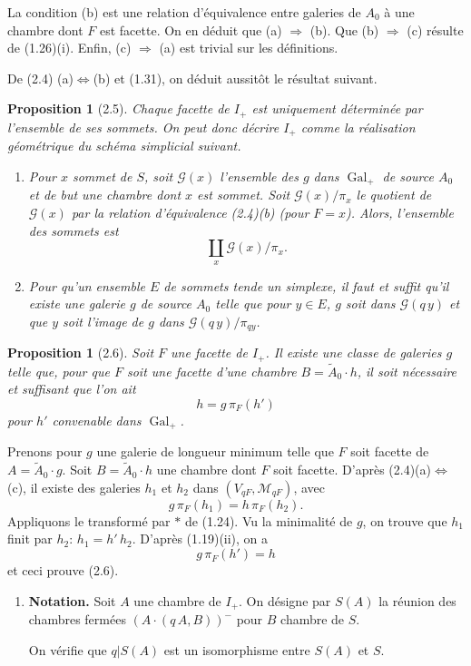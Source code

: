 \documentclass[12pt]{article}
\newtheorem{proposition}[theoreme]{Proposition}
\theoremstyle{remark}
\DeclareMathOperator{\Gal}{Gal}
\begin{document}
La condition (b) est une relation d'équivalence entre galeries de $A_0$ à une chambre dont $F$ est facette. On en déduit que (a) $\Rightarrow$ (b). Que (b) $\Rightarrow$ (c) résulte de (1.26)(i). Enfin, (c) $\Rightarrow$ (a) est trivial sur les définitions.

De (2.4) (a)$\Leftrightarrow$(b) et (1.31), on déduit aussitôt le résultat suivant.

\begin{proposition}[2.5]
Chaque facette de $I_+$ est uniquement déterminée par l'ensemble de ses sommets. On peut donc décrire $I_+$ comme la réalisation géométrique du schéma simplicial suivant.
\begin{enumerate}
\item[a)] Pour $x$ sommet de $S$, soit $\mathscr{G}(x)$ l'ensemble des $g$ dans $\Gal_+$ de source $A_0$ et de but une chambre dont $x$ est sommet. Soit $\mathscr{G}(x)/\pi_x$ le quotient de $\mathscr{G}(x)$ par la relation d'équivalence (2.4)(b) (pour $F = x$). Alors, l'ensemble des sommets est
\[\coprod_x \mathscr{G}(x)/\pi_x.\]
\item[b)] Pour qu'un ensemble $E$ de sommets \emph{tende} un simplexe, il faut et suffit qu'il existe une galerie $g$ de source $A_0$ telle que pour $y \in E$, $g$ soit dans $\mathscr{G}(q \, y)$ et que $y$ soit l'image de $g$ dans $\mathscr{G}(q \, y)/\pi_{q y}$.
\end{enumerate}
\end{proposition}

\begin{proposition}[2.6]
Soit $F$ une facette de $I_+$. Il existe une classe de galeries $g$ telle que, pour que $F$ soit une facette d'une chambre $B = \tilde{A}_0 \cdot h$, il soit nécessaire et suffisant que l'on ait
\[h = g \, \pi_F(h')\]
pour $h'$ convenable dans $\Gal_+$.
\end{proposition}

Prenons pour $g$ une galerie de longueur minimum telle que $F$ soit facette de $A = \tilde{A}_0 \cdot g$. Soit $B = \tilde{A}_0 \cdot h$ une chambre dont $F$ soit facette. D'après (2.4)(a)$\Leftrightarrow$(c), il existe des galeries $h_1$ et $h_2$ dans $(V_{qF}, \mathcal{M}_{qF})$, avec
\[g \, \pi_F(h_1) = h \, \pi_F(h_2).\]
Appliquons le transformé par $*$ de (1.24). Vu la minimalité de $g$, on trouve que $h_1$ finit par $h_2$: $h_1 = h' \, h_2$. D'après (1.19)(ii), on a
\[g \, \pi_F(h') = h\]
et ceci prouve (2.6).

\begin{enumerate}
\item[(2.7)] \textbf{Notation.} Soit $A$ une chambre de $I_+$. On désigne par $S(A)$ la réunion des chambres fermées $(A \cdot (q \, A, B))^-$ pour $B$ chambre de $S$.

On vérifie que $q|S(A)$ est un isomorphisme entre $S(A)$ et $S$.
\end{enumerate}
\end{document}
